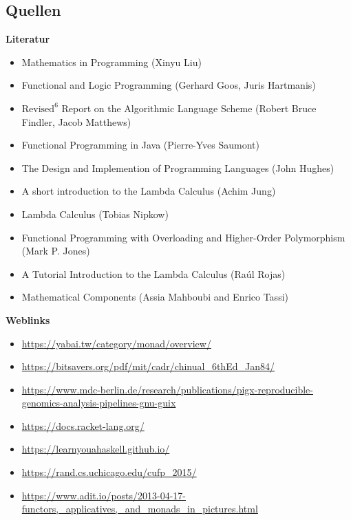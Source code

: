 \documentclass{beamer}
\begin{document}
\begin{frame}
	\section{Quellen}
	\fontsize{8pt}{10pt}
	\centering
	\textbf{Literatur}
	\begin{itemize}
    \item Mathematics in Programming (Xinyu Liu)
\item Functional and Logic Programming (Gerhard Goos, Juris Hartmanis)
\item $\text{Revised}^6$ Report on the Algorithmic Language
Scheme (Robert Bruce Findler, Jacob Matthews)
\item Functional Programming in Java (Pierre-Yves Saumont)
\item The Design and Implemention of Programming Languages (John Hughes)
\item A short introduction to the Lambda Calculus (Achim Jung)
\item Lambda Calculus (Tobias Nipkow) 
\item   Functional Programming with Overloading and
Higher-Order Polymorphism (Mark P. Jones)
\item A Tutorial Introduction to the Lambda Calculus (Raúl Rojas)
\item Mathematical Components (Assia Mahboubi and Enrico Tassi)
 \end{itemize}
 \textbf{Weblinks}
	\begin{itemize}
		\item \url{https://yabai.tw/category/monad/overview/}
        \item \url{https://bitsavers.org/pdf/mit/cadr/chinual_6thEd_Jan84/}
        \item \url{https://www.mdc-berlin.de/research/publications/pigx-reproducible-genomics-analysis-pipelines-gnu-guix}
        \item \url{https://docs.racket-lang.org/}
        \item \url{https://learnyouahaskell.github.io/}
        \item \url{https://rand.cs.uchicago.edu/cufp_2015/}
        \item \url{https://www.adit.io/posts/2013-04-17-functors,_applicatives,_and_monads_in_pictures.html}
	\end{itemize}
 
\end{frame}
\end{document}
